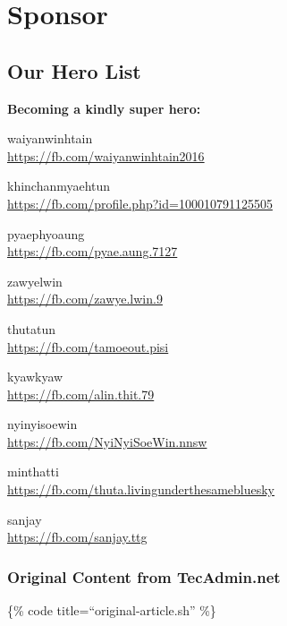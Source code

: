 \pagebreak

\hypertarget{sponsor}{%
\section{Sponsor}\label{sponsor}}

\hypertarget{our-hero-list}{%
\subsection{Our Hero List}\label{our-hero-list}}

\textbf{Becoming a kindly super hero:}

waiyanwinhtain\\
\url{https://fb.com/waiyanwinhtain2016}

khinchanmyaehtun\\
\url{https://fb.com/profile.php?id=100010791125505}

pyaephyoaung\\
\url{https://fb.com/pyae.aung.7127}

zawyelwin\\
\url{https://fb.com/zawye.lwin.9}

thutatun\\
\url{https://fb.com/tamoeout.pisi}

kyawkyaw\\
\url{https://fb.com/alin.thit.79}

nyinyisoewin\\
\url{https://fb.com/NyiNyiSoeWin.nnsw}

minthatti\\
\url{https://fb.com/thuta.livingunderthesamebluesky}

sanjay\\
\url{https://fb.com/sanjay.ttg}

\hypertarget{original-content-from-tecadmin.net}{%
\subsubsection{Original Content from
TecAdmin.net}\label{original-content-from-tecadmin.net}}

\{\% code title=``original-article.sh'' \%\}

\begin{Shaded}
\begin{Highlighting}[]
\end{Highlighting}
\end{Shaded}

